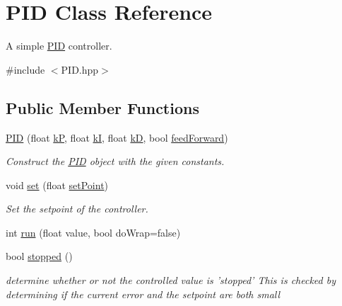\hypertarget{classPID}{\section{P\-I\-D Class Reference}
\label{classPID}
}


A simple \hyperlink{classPID}{P\-I\-D} controller.  




{\ttfamily \#include $<$P\-I\-D.\-hpp$>$}

\subsection*{Public Member Functions}
\begin{DoxyCompactItemize}
\item 
\hyperlink{classPID_acf0310be28ae782627e1671f4a663543}{P\-I\-D} (float \hyperlink{classPID_ac4815cca85109a6e13b10c2415104328}{k\-P}, float \hyperlink{classPID_ac686925341bcab06b11df109533b6807}{k\-I}, float \hyperlink{classPID_a5a07dca1e267a62af08ebd07781f1e9e}{k\-D}, bool \hyperlink{classPID_aaad110febd9150a54528b9cb6ff145e8}{feed\-Forward})
\begin{DoxyCompactList}\small\item\em Construct the \hyperlink{classPID}{P\-I\-D} object with the given constants. \end{DoxyCompactList}\item 
void \hyperlink{classPID_ac42a9b324383cc5ba0fec0f3ff41913e}{set} (float \hyperlink{classPID_aab66dffb3291ee486568e8b73cb71831}{set\-Point})
\begin{DoxyCompactList}\small\item\em Set the setpoint of the controller. \end{DoxyCompactList}\item 
int \hyperlink{classPID_a787c74101b0fed1eba2df4d82000028e}{run} (float value, bool do\-Wrap=false)
\item 
bool \hyperlink{classPID_a443ba218324fabf44754b1bab2be5fd6}{stopped} ()
\begin{DoxyCompactList}\small\item\em determine whether or not the controlled value is 'stopped' This is checked by determining if the current error and the setpoint are both small \end{DoxyCompactList}\end{DoxyCompactItemize}
